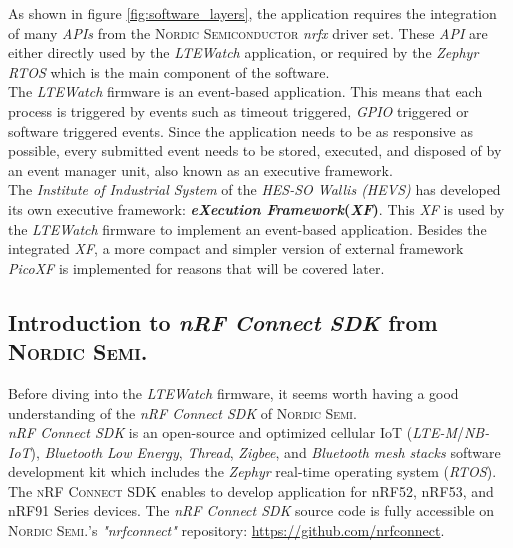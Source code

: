 \documentclass[report.tex]{subfiles}
\begin{document}
As shown in figure \ref{fig:software_layers}, the application requires the integration of many \textit{APIs} from the \textsc{Nordic Semiconductor} \textit{nrfx} driver set. These \textit{API} are either directly used by the \textit{LTEWatch} application, or required by the \textit{Zephyr} \textit{RTOS} which is the main component of the software.\\

The \textit{LTEWatch} firmware is an event-based application. This means that each process is triggered by events such as timeout triggered, \textit{GPIO} triggered or software triggered events. Since the application needs to be as responsive as possible, every submitted event needs to be stored, executed, and disposed of by an event manager unit, also known as an executive framework.\\

The \textit{Institute of Industrial System} of the \textit{HES-SO Wallis (HEVS)} has developed its own executive framework: \textbf{\textit{eXecution Framework}(\textit{XF})}. This \textit{XF} is used by the \textit{LTEWatch} firmware to implement an event-based application. Besides the integrated \textit{XF}, a more compact and simpler version of external framework \textit{PicoXF} is implemented for reasons that will be covered later.

\subsection{Introduction to \textit{nRF Connect SDK} from \textsc{Nordic Semi.}}

Before diving into the \textit{LTEWatch} firmware, it seems worth having a good understanding of the \textit{nRF Connect SDK} of \textsc{Nordic Semi}.\\

\textit{nRF Connect SDK} is an open-source and optimized cellular IoT (\textit{LTE-M}/\textit{NB-IoT}), \textit{Bluetooth Low Energy}, \textit{Thread}, \textit{Zigbee}, and \textit{Bluetooth mesh stacks} software development kit which includes the \textit{Zephyr} real-time operating system (\textit{RTOS}). The \textsc{nRF Connect SDK} enables to develop application for nRF52, nRF53, and nRF91 Series devices. The \textit{nRF Connect SDK} source code is fully accessible on \textsc{Nordic Semi.}'s \textit{"nrfconnect"} repository: \url{https://github.com/nrfconnect}.
\end{document}

